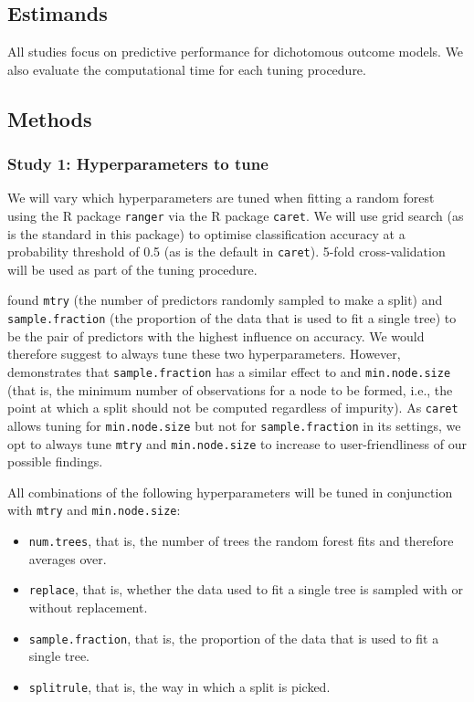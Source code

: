 \documentclass{article}
\begin{document}
\subsection{Estimands}

All studies focus on predictive performance for dichotomous outcome models. We also evaluate the computational time for each tuning procedure.

\subsection{Methods}

\subsubsection{Study 1: Hyperparameters to tune}

We will vary which hyperparameters are tuned when fitting a random forest using the R package \texttt{ranger} via the R package \texttt{caret}. We will use grid search (as is the standard in this package) to optimise classification accuracy at a probability threshold of 0.5 (as is the default in \texttt{caret}). 5-fold cross-validation will be used as part of the tuning procedure.

\cite{probst_tunability_2019} found \texttt{mtry} (the number of predictors randomly sampled to make a split) and \texttt{sample.fraction} (the proportion of the data that is used to fit a single tree) to be the pair of predictors with the highest influence on accuracy. We would therefore suggest to always tune these two hyperparameters. However, \cite{scornet_tuning_2017} demonstrates that \texttt{sample.fraction} has a similar effect to and \texttt{min.node.size} (that is, the minimum number of observations for a node to be formed, i.e., the point at which a split should not be computed regardless of impurity). As \texttt{caret} allows tuning for \texttt{min.node.size} but not for \texttt{sample.fraction} in its settings, we opt to always tune \texttt{mtry} and \texttt{min.node.size} to increase to user-friendliness of our possible findings.

All combinations of the following hyperparameters will be tuned in conjunction with \texttt{mtry} and \texttt{min.node.size}:
\begin{itemize}
    \item \texttt{num.trees}, that is, the number of trees the random forest fits and therefore averages over.
    \item \texttt{replace}, that is, whether the data used to fit a single tree is sampled with or without replacement.
    \item \texttt{sample.fraction}, that is, the proportion of the data that is used to fit a single tree.
    \item \texttt{splitrule}, that is, the way in which a split is picked.
\end{itemize}
\end{document}
